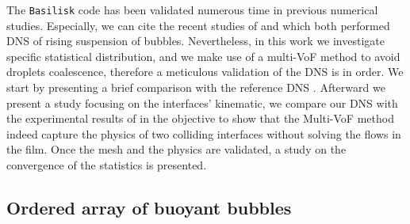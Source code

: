 The \texttt{Basilisk} code has been validated numerous time in previous numerical studies. 
Especially, we can cite the recent studies of \citet{innocenti2020direct} and \citet{hidman2023assessing} which both performed DNS of rising suspension of bubbles. 
Nevertheless, in this work we investigate specific statistical distribution,
and we make use of a multi-VoF method to avoid droplets coalescence, therefore a meticulous validation of the DNS is in order. 
We start by presenting a brief comparison with the reference DNS \citet{esmaeeli1999direct}. 
Afterward we present a study focusing on the interfaces' kinematic, we compare our DNS with the experimental results of \citet{mohamed2003drop} in the objective to show that the Multi-VoF method indeed capture the physics of two colliding interfaces without solving the flows in the film. 
Once the mesh and the physics are validated, a study on the convergence of the statistics is presented. 

\subsection*{Ordered array of buoyant bubbles}


